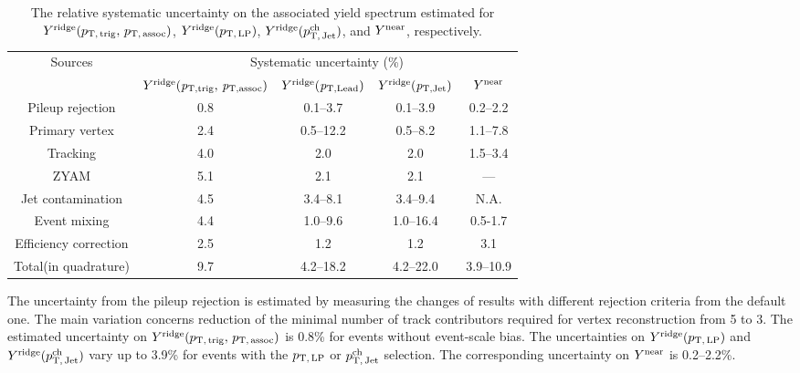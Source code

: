 \begin{table}[h!]
\caption{The relative systematic uncertainty on the associated yield spectrum estimated for $Y^{\rm{ridge}}(p_\mathrm{T,\,trig},\,p_\mathrm{T,\,assoc})$, $Y^{\rm{ridge}}(p_\mathrm{T,\,LP})$, $Y^{\rm{ridge}}(p_\mathrm{T,\,Jet}^\mathrm{ch})$, and $Y^{\rm{near}}$, respectively.}
\centering
\begin{tabular}{|c|c|c|c|c|}
\hline 
\multirow{2}{*}{Sources}  & \multicolumn{4}{c|}{Systematic uncertainty (\%)} \\\cline{2-5} 
         & $Y^{\rm{ridge}}(\it{p}_{\rm{T, trig}},\,\it{p}_{\rm{T, assoc}})$ & $Y^{\rm{ridge}}(\it{p}_{\rm{T, Lead}})$ & $Y^{\rm{ridge}}(\it{p}_{\rm{T, Jet}})$ & $Y^{\rm{near}}$ \\ \hline \hline
Pileup rejection		& 0.8	&0.1--3.7		&0.1--3.9	&0.2--2.2	\\ \hline
Primary vertex		& 2.4	&0.5--12.2	&0.5--8.2	&1.1--7.8	\\ \hline

Tracking			& 4.0 	&2.0		&2.0	&1.5--3.4	\\ \hline

ZYAM			& 5.1	&2.1		&2.1	&---	\\ \hline
Jet contamination	& 4.5	&3.4--8.1		&3.4--9.4	&N.A.	\\ \hline

Event mixing			& 4.4	&1.0--9.6		&1.0--16.4	&0.5-1.7	\\ \hline

Efficiency correction	& 2.5 	&1.2		&1.2	&3.1	\\ \hline \hline
Total(in quadrature)			& 9.7	&4.2--18.2	&4.2--22.0	&3.9--10.9 \\ 
\hline 
\end{tabular}
\label{tab:syst}
\end{table}

The uncertainty from the pileup rejection is estimated by measuring the changes of results with different rejection criteria from the default one. The main variation concerns reduction of the minimal number of track contributors required for vertex reconstruction from 5 to 3. The estimated uncertainty on $Y^{\rm{ridge}}(p_\mathrm{T,\,trig},\,p_\mathrm{T,\,assoc})$ is 0.8\% for events without event-scale bias. The uncertainties on $Y^{\rm{ridge}}(p_\mathrm{T,\,LP})$ and $Y^{\rm{ridge}}(p_\mathrm{T,\,Jet}^\mathrm{ch})$ vary up to 3.9\% for events with the $p_\mathrm{T,\,LP}$ or $p_\mathrm{T,\,Jet}^\mathrm{ch}$ selection. The corresponding uncertainty on $Y^{\rm{near}}$ is 0.2--2.2\%.
 
